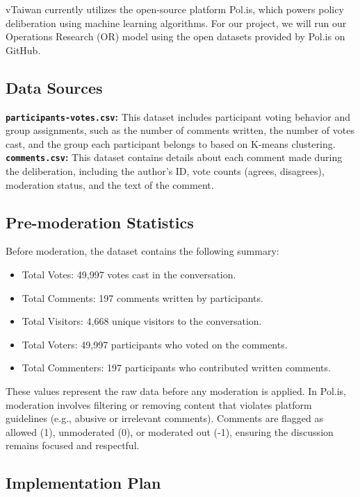 \documentclass[11pt,a4paper]{article}
\begin{document}
vTaiwan currently utilizes the open-source platform Pol.is, which powers policy deliberation using machine learning algorithms. For our project, we will run our Operations Research (OR) model using the open datasets provided by Pol.is on GitHub.

\subsection{Data Sources}

\textbf{\texttt{participants-votes.csv}:} This dataset includes participant voting behavior and group assignments, such as the number of comments written, the number of votes cast, and the group each participant belongs to based on K-means clustering. \\
\textbf{\texttt{comments.csv}:} This dataset contains details about each comment made during the deliberation, including the author’s ID, vote counts (agrees, disagrees), moderation status, and the text of the comment.

\subsection{Pre-moderation Statistics}

Before moderation, the dataset contains the following summary:
\begin{itemize}
    \item Total Votes: 49,997 votes cast in the conversation.
    \item Total Comments: 197 comments written by participants.
    \item Total Visitors: 4,668 unique visitors to the conversation.
    \item Total Voters: 49,997 participants who voted on the comments.
    \item Total Commenters: 197 participants who contributed written comments.
\end{itemize}

These values represent the raw data before any moderation is applied. In Pol.is, moderation involves filtering or removing content that violates platform guidelines (e.g., abusive or irrelevant comments). Comments are flagged as allowed (1), unmoderated (0), or moderated out (-1), ensuring the discussion remains focused and respectful.

\subsection{Implementation Plan}
\end{document}
